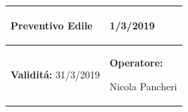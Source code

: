 \documentclass[a4paper]{article}
\begin{document}
                                  \begin{center}
                                  \begin{tabular}{|L{89mm} R{60mm}| }
                                  \hline
                                  \vspace{2.5mm}
                                  \begin{spacing}{0}
                                \textbf{Preventivo Edile}
                                  \end{spacing}&
                                  \vspace{2.5mm}
                                  \begin{spacing}{0}

                                1/3/2019

                                  \end{spacing}\\
                                  \hline
                                  \vspace{2.5mm}
                                  \begin{spacing}{0}

                                
                                        \textbf{Validit\'a:}
                                   31/3/2019
                                  \end{spacing} &
                                  \vspace{2.5mm}
                                  \begin{spacing}{0}
                                    \textbf{Operatore:}

                               Nicola Pancheri
                                  \end{spacing} \\
                                  \hline
                                  \end{tabular}
                                  \end{center}
                               
\end{document}
